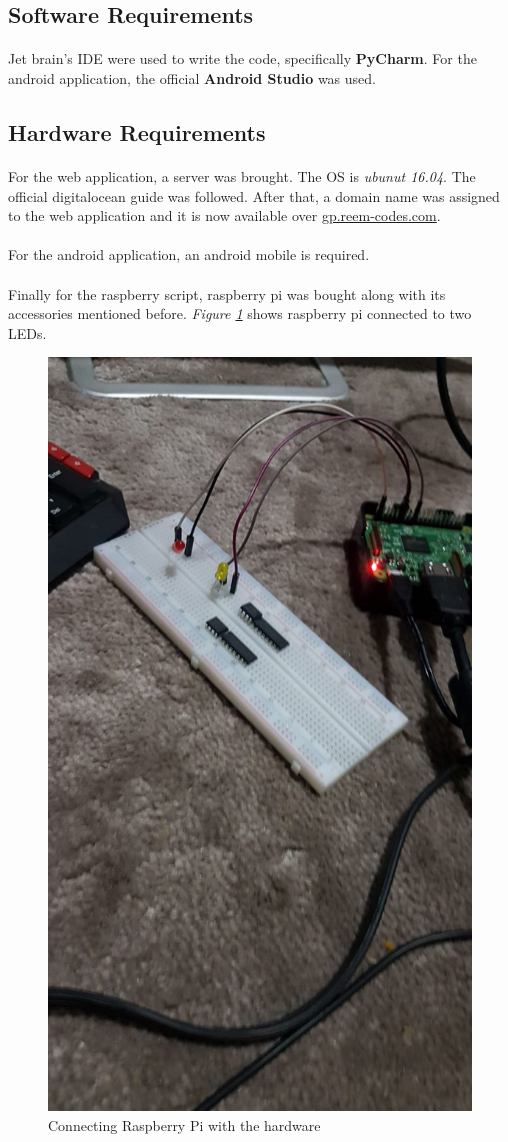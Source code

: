 \documentclass[12pt, oneside, a4paper]{book}
\begin{document}
		\subsection{Software Requirements}
		\paragraph{} Jet brain's IDE were used to write the code, specifically \textbf{PyCharm}. For the android application, the official \textbf{Android Studio} was used.
		
		\subsection{Hardware Requirements}
		\paragraph{} For the web application, a server was brought. The OS is \textit{ubunut 16.04}. The official digitalocean \cite{digitalocean_2019} guide was followed. After that, a domain name was assigned to the web application and it is now available over \url{gp.reem-codes.com}.
		\paragraph{} For the android application, an android mobile is required.
		\paragraph{} Finally for the raspberry script, raspberry pi was bought along with its accessories mentioned before. \textit{Figure \ref{conn}} shows raspberry pi connected to two LEDs.
		\begin{figure}[H]
			\centering
			\includegraphics[width=.5\linewidth]{img/connect.jpg}
			\caption{Connecting Raspberry Pi with the hardware}
			\label{conn}
		\end{figure}
		
\end{document}
